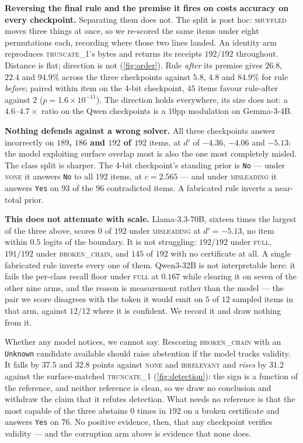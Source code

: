 \documentclass{article}
\begin{document}
\textbf{Reversing the final rule and the premise it fires on costs accuracy on
every checkpoint.} Separating them does not. The split is post hoc:
\textsc{shuffled} moves three things at once, so we re-scored the same items
under eight permutations each, recording where those two lines landed. An identity arm reproduces \textsc{truncate\_1}'s bytes and
returns its receipts $192/192$ throughout. Distance is flat; direction is not
(\cref{fig:order}). Rule \emph{after} its premise gives $26.8$, $22.4$ and $94.9\%$ across the three checkpoints against
$5.8$, $4.8$ and $84.9\%$ for rule \emph{before}; paired within item on the
4-bit checkpoint, $45$ items favour rule-after against $2$
($p = 1.6\times10^{-11}$). The direction holds everywhere, its size does not: a
$4.6$--$4.7\times$ ratio on the Qwen checkpoints is a $10$pp modulation on
Gemma-3-4B.

\textbf{Nothing defends against a wrong solver.} All three checkpoints answer
incorrectly on
\textbf{$189$, $186$ and $192$ of $192$} items, at $d'$ of $-4.36$, $-4.06$ and
$-5.13$: the model exploiting surface overlap most is also the one most
completely misled. The class split is sharper. The 4-bit checkpoint's standing prior is
\texttt{No} --- under \textsc{none} it answers \texttt{No} to all $192$ items,
at $c = 2.565$ --- and under \textsc{misleading} it answers \texttt{Yes} on $93$
of the $96$ contradicted items. A fabricated rule inverts a near-total prior.

\textbf{This does not attenuate with scale.} Llama-3.3-70B, sixteen times the
largest of the three above, scores $0$ of $192$ under \textsc{misleading} at
$d' = -5.13$, no item within $0.5$ logits of the boundary. It is not
struggling: $192/192$ under \textsc{full}, $191/192$ under
\textsc{broken\_chain}, and $145$ of $192$ with no certificate at all. A single
fabricated rule inverts every one of them. Qwen3-32B is not interpretable here: it fails the
per-class recall floor under \textsc{full} at $0.167$ while clearing it on seven
of the other nine arms, and the reason is measurement rather than the model ---
the pair we score
disagrees with the token it would emit on $5$ of $12$ sampled items in that arm,
against $12/12$ where it is confident. We record it and draw nothing from it.

Whether any model notices, we cannot say. Rescoring \textsc{broken\_chain} with
an \texttt{Unknown} candidate available should raise abstention if the model
tracks validity. It falls by $37.5$ and $32.8$ points against \textsc{none} and
\textsc{irrelevant} and \emph{rises} by $31.2$ against the surface-matched
\textsc{truncate\_1}
(\cref{fig:detection}): the sign is a function of the reference, and neither
reference is clean, so we draw no conclusion and withdraw the claim that it
refutes detection. What needs no reference is that the most capable of the three
abstains $0$ times in $192$ on a broken certificate and answers \texttt{Yes} on
$76$. No positive evidence, then, that any checkpoint verifies validity --- and
the corruption arm above is evidence that none does.
\end{document}
